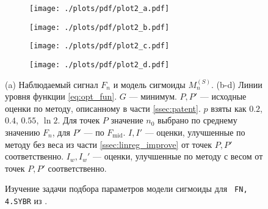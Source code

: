 \begin{figure}
  {\centering

  \begin{subfigure}{\textwidth}
    \centering
    \texttt{[image: ./plots/pdf/plot2\_a.pdf]}
    \caption{}
  \end{subfigure}

  \begin{subfigure}{\textwidth}
    \centering
    \texttt{[image: ./plots/pdf/plot2\_b.pdf]}
    \caption{}
  \end{subfigure}

  \begin{subfigure}{0.49\textwidth}
    \centering
    \texttt{[image: ./plots/pdf/plot2\_c.pdf]}
    \caption{}
  \end{subfigure}
  \hfill
  \begin{subfigure}{0.49\textwidth}
    \centering
    \texttt{[image: ./plots/pdf/plot2\_d.pdf]}
    \caption{}
  \end{subfigure}

  \caption{Изучение задачи подбора параметров модели сигмоиды для {\tt
  FN, 4.SYBR} из \cite{karlenStatisticalSignificanceQuantitative2007}.}
  \label{fig:opt_cont}

  }

  (a) Наблюдаемый сигнал $F_{n}$ и модель сигмоиды $M^{(S)}_{n}$. (b-d) Линии
  уровня функции \eqref{eq:opt_fun}. $G$ --- минимум. $P,P'$ --- исходные
  оценки по методу, описанному в части \ref{ssec:patent}. $p$ взяты как $0.2$,
  $0.4$, $0.55$, $\ln 2$. Для точек $P$ значение $n_0$ выбрано по среднему
  значению $F_{n}$, для $P'$ --- по $F_{\text{mid}}$. $I,I'$ --- оценки,
  улучшенные по методу без веса из части \ref{ssec:linreg_improve} от точек
  $P,P'$ соответственно. $I_{w},I_{w}'$ --- оценки, улучшенные по методу с
  весом от точек $P,P'$ соответственно.

\end{figure}


